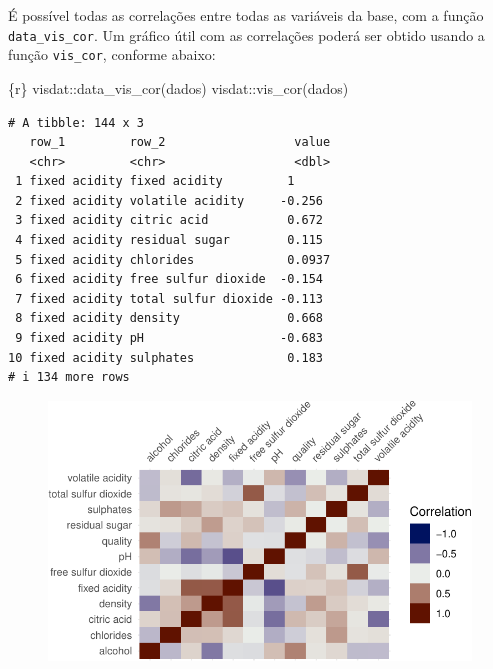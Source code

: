 \documentclass[
  letterpaper,
  DIV=11,
  numbers=noendperiod,
  oneside]{scrartcl}
\newenvironment{Shaded}{\begin{snugshade}}{\end{snugshade}}
\newcommand{\FunctionTok}[1]{\textcolor[rgb]{0.28,0.35,0.67}{#1}}
\newcommand{\InformationTok}[1]{\textcolor[rgb]{0.37,0.37,0.37}{#1}}
\newcommand{\NormalTok}[1]{\textcolor[rgb]{0.00,0.23,0.31}{#1}}
\newcommand{\SpecialCharTok}[1]{\textcolor[rgb]{0.37,0.37,0.37}{#1}}
\begin{document}
É possível todas as correlações entre todas as variáveis da base, com a
função \texttt{data\_vis\_cor}. Um gráfico útil com as correlações
poderá ser obtido usando a função \texttt{vis\_cor}, conforme abaixo:

\begin{Shaded}
\begin{Highlighting}[]
\InformationTok{\textasciigrave{}\textasciigrave{}\textasciigrave{}\{r\}}
\NormalTok{visdat}\SpecialCharTok{::}\FunctionTok{data\_vis\_cor}\NormalTok{(dados)}
\NormalTok{visdat}\SpecialCharTok{::}\FunctionTok{vis\_cor}\NormalTok{(dados)}
\InformationTok{\textasciigrave{}\textasciigrave{}\textasciigrave{}}
\end{Highlighting}
\end{Shaded}

\begin{verbatim}
# A tibble: 144 x 3
   row_1         row_2                  value
   <chr>         <chr>                  <dbl>
 1 fixed acidity fixed acidity         1     
 2 fixed acidity volatile acidity     -0.256 
 3 fixed acidity citric acid           0.672 
 4 fixed acidity residual sugar        0.115 
 5 fixed acidity chlorides             0.0937
 6 fixed acidity free sulfur dioxide  -0.154 
 7 fixed acidity total sulfur dioxide -0.113 
 8 fixed acidity density               0.668 
 9 fixed acidity pH                   -0.683 
10 fixed acidity sulphates             0.183 
# i 134 more rows
\end{verbatim}

\begin{figure}[H]

{\centering \includegraphics{tufte_svm_regressao_files/figure-pdf/unnamed-chunk-5-1.pdf}

}

\end{figure}
\end{document}
